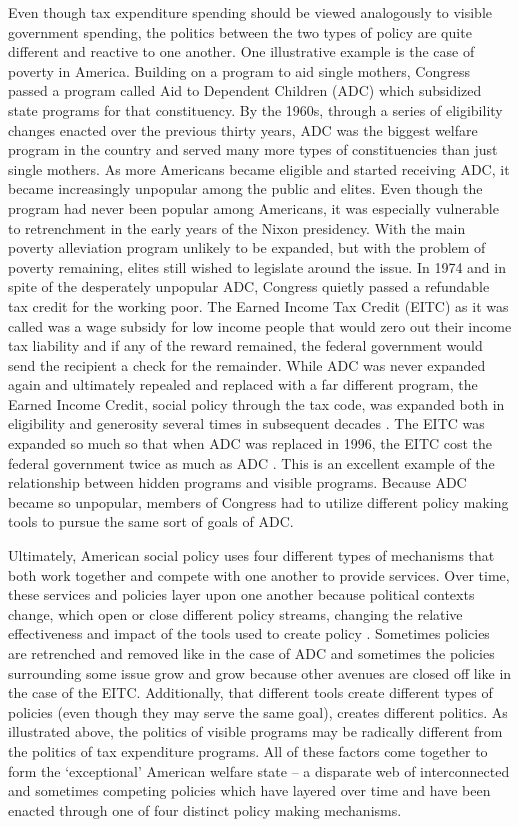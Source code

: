\documentclass[12pt]{article}
\begin{document}
Even though tax expenditure spending should be viewed analogously to visible government spending, the politics between the two types of policy are quite different and reactive to one another. One illustrative example is the case of poverty in America. Building on a program to aid single mothers, Congress passed a program called Aid to Dependent Children (ADC) which subsidized state programs for that constituency. By the 1960s, through a series of eligibility changes enacted over the previous thirty years, ADC was the biggest welfare program in the country and served many more types of constituencies than just single mothers. As more Americans became eligible and started receiving ADC, it became increasingly unpopular among the public and elites. Even though the program had never been popular among Americans, it was especially vulnerable to retrenchment in the early years of the Nixon presidency. With the main poverty alleviation program unlikely to be expanded, but with the problem of poverty remaining, elites still wished to legislate around the issue. In 1974 and in spite of the desperately unpopular ADC, Congress quietly passed a refundable tax credit for the working poor. The Earned Income Tax Credit (EITC) as it was called was a wage subsidy for low income people that would zero out their income tax liability and if any of the reward remained, the federal government would send the recipient a check for the remainder. While ADC was never expanded again and ultimately repealed and replaced with a far different program, the Earned Income Credit, social policy through the tax code, was expanded both in eligibility and generosity several times in subsequent decades \citep{stewart1991}. The EITC was expanded so much so that when ADC was replaced in 1996, the EITC cost the federal government twice as much as ADC \citep{myles1997}. This is an excellent example of the relationship between hidden programs and visible programs. Because ADC became so unpopular, members of Congress had to utilize different policy making tools to pursue the same sort of goals of ADC.

Ultimately, American social policy uses four different types of mechanisms that both work together and compete with one another to provide services. Over time, these services and policies layer upon one another because political contexts change, which open or close different policy streams, changing the relative effectiveness and impact of the tools used to create policy \citep{kingdon2011}. Sometimes policies are retrenched and removed like in the case of ADC and sometimes the policies surrounding some issue grow and grow because other avenues are closed off like in the case of the EITC. Additionally, that different tools create different types of policies (even though they may serve the same goal), creates different politics. As illustrated above, the politics of visible programs may be radically different from the politics of tax expenditure programs. All of these factors come together to form the `exceptional' American welfare state -- a disparate web of interconnected and sometimes competing policies which have layered over time and have been enacted through one of four distinct policy making mechanisms.
\end{document}
